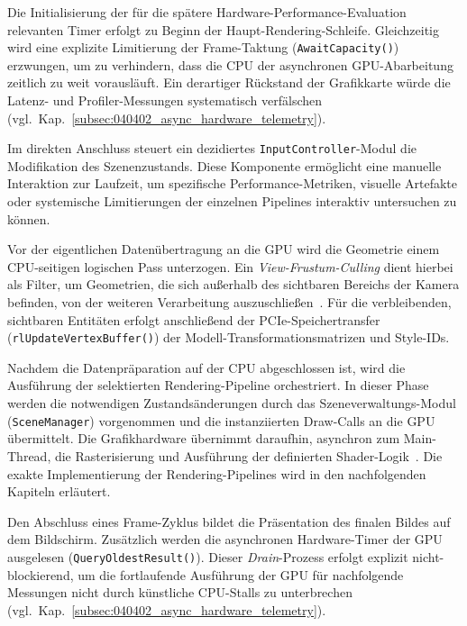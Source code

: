 Die Initialisierung der für die spätere Hardware-Performance-Evaluation relevanten Timer erfolgt zu Beginn der
Haupt-Rendering-Schleife.
Gleichzeitig wird eine explizite Limitierung der Frame-Taktung (\texttt{AwaitCapacity()}) erzwungen, um zu verhindern,
dass die \ac{CPU} der asynchronen \ac{GPU}-Abarbeitung zeitlich zu weit vorausläuft.
Ein derartiger Rückstand der Grafikkarte würde die Latenz- und Profiler-Messungen systematisch verfälschen
(vgl.\ Kap.~\ref{subsec:040402_async_hardware_telemetry}).

Im direkten Anschluss steuert ein dezidiertes \texttt{InputController}-Modul die Modifikation des Szenenzustands.
Diese Komponente ermöglicht eine manuelle Interaktion zur Laufzeit, um spezifische Performance-Metriken, visuelle
Artefakte oder systemische Limitierungen der einzelnen Pipelines interaktiv untersuchen zu können.

Vor der eigentlichen Datenübertragung an die \ac{GPU} wird die Geometrie einem \ac{CPU}-seitigen logischen Pass
unterzogen.
Ein \textit{View-Frustum-Culling} dient hierbei als Filter, um Geometrien, die sich außerhalb des
sichtbaren Bereichs der Kamera befinden, von der weiteren Verarbeitung
auszuschließen~\parencite[vgl.][Kap.~11.2.7, Abschn.~\textit{Frustum Culling}]{gregoryGameEngineArchitecture2018}.
Für die verbleibenden, sichtbaren Entitäten erfolgt anschließend der \ac{PCIe}-Speichertransfer
(\texttt{rlUpdateVertexBuffer()}) der Modell-Transformationsmatrizen und Style-IDs.

Nachdem die Datenpräparation auf der \ac{CPU} abgeschlossen ist, wird die Ausführung der selektierten Rendering-Pipeline
orchestriert.
In dieser Phase werden die notwendigen Zustandsänderungen durch das Szeneverwaltungs-Modul (\texttt{SceneManager})
vorgenommen und die instanziierten Draw-Calls an die \ac{GPU} übermittelt.
Die Grafikhardware übernimmt daraufhin, asynchron zum Main-Thread, die Rasterisierung und Ausführung der definierten
Shader-Logik~\parencite[vgl.][S.~494]{OpenGLInsights}.
Die exakte Implementierung der Rendering-Pipelines wird in den nachfolgenden Kapiteln erläutert.

Den Abschluss eines Frame-Zyklus bildet die Präsentation des finalen Bildes auf dem Bildschirm.
Zusätzlich werden die asynchronen Hardware-Timer der \ac{GPU} ausgelesen (\texttt{QueryOldestResult()}).
Dieser \textit{Drain}-Prozess erfolgt explizit nicht-blockierend, um die fortlaufende Ausführung der \ac{GPU} für
nachfolgende Messungen nicht durch künstliche \ac{CPU}-Stalls zu unterbrechen
(vgl.\ Kap.~\ref{subsec:040402_async_hardware_telemetry}).

